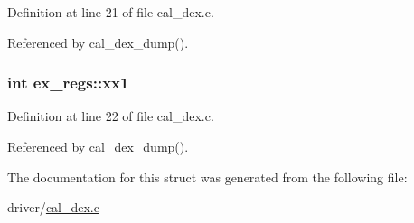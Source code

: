 Definition at line 21 of file cal\-\_\-dex.\-c.



Referenced by cal\-\_\-dex\-\_\-dump().

\hypertarget{structex__regs_a12379b0b3152b878eebc8f18a6efeaf0}{
\subsubsection[{xx1}]{\setlength{\rightskip}{0pt plus 5cm}int ex\-\_\-regs\-::xx1}}\label{structex__regs_a12379b0b3152b878eebc8f18a6efeaf0}


Definition at line 22 of file cal\-\_\-dex.\-c.



Referenced by cal\-\_\-dex\-\_\-dump().



The documentation for this struct was generated from the following file\-:\begin{DoxyCompactItemize}
\item 
driver/\hyperlink{cal__dex_8c}{cal\-\_\-dex.\-c}\end{DoxyCompactItemize}

